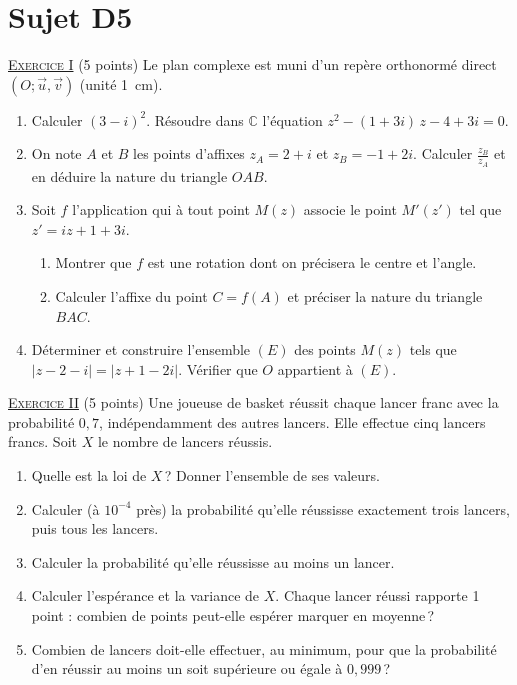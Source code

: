 \newpage
\section{Sujet D5}
\noindent \underline{\textsc{Exercice I}} (5 points) \newline
Le plan complexe est muni d'un rep\`ere orthonorm\'e direct $(O ; \vec{u}, \vec{v})$ (unit\'e 1~cm).
\begin{enumerate}
      \item Calculer $(3 - i)^2$. R\'esoudre dans $\mathbb{C}$ l'\'equation $z^2 - (1 + 3i)\,z - 4 + 3i = 0$.
      \item On note $A$ et $B$ les points d'affixes $z_A = 2 + i$ et $z_B = -1 + 2i$.
            Calculer $\frac{z_B}{z_A}$ et en d\'eduire la nature du triangle $OAB$.
      \item Soit $f$ l'application qui \`a tout point $M(z)$ associe le point $M'(z')$ tel que $z' = iz + 1 + 3i$.
            \begin{enumerate}
            \item Montrer que $f$ est une rotation dont on pr\'ecisera le centre et l'angle.
            \item Calculer l'affixe du point $C = f(A)$ et pr\'eciser la nature du triangle $BAC$.
            \end{enumerate}
      \item D\'eterminer et construire l'ensemble $(E)$ des points $M(z)$ tels que $|z - 2 - i| = |z + 1 - 2i|$.
            V\'erifier que $O$ appartient \`a $(E)$.
\end{enumerate}

\noindent \underline{\textsc{Exercice II}} (5 points) \newline
Une joueuse de basket r\'eussit chaque lancer franc avec la probabilit\'e $0{,}7$, ind\'ependamment des autres lancers.
Elle effectue cinq lancers francs. Soit $X$ le nombre de lancers r\'eussis.
\begin{enumerate}
      \item Quelle est la loi de $X$\,? Donner l'ensemble de ses valeurs.
      \item Calculer (\`a $10^{-4}$ pr\`es) la probabilit\'e qu'elle r\'eussisse exactement trois lancers, puis tous les lancers.
      \item Calculer la probabilit\'e qu'elle r\'eussisse au moins un lancer.
      \item Calculer l'esp\'erance et la variance de $X$. Chaque lancer r\'eussi rapporte 1 point :
            combien de points peut-elle esp\'erer marquer en moyenne\,?
      \item Combien de lancers doit-elle effectuer, au minimum, pour que la probabilit\'e d'en r\'eussir au moins un
            soit sup\'erieure ou \'egale \`a $0{,}999$\,?
\end{enumerate}

